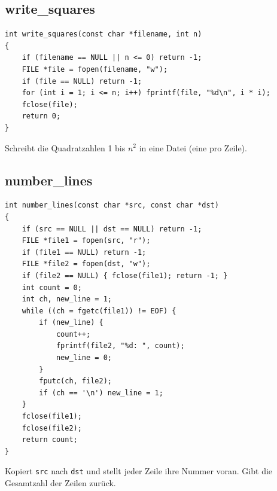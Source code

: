 \documentclass[10pt, a4paper]{article}
\begin{document}
\subsection{write\_squares}
\begin{lstlisting}
int write_squares(const char *filename, int n)
{
    if (filename == NULL || n <= 0) return -1;
    FILE *file = fopen(filename, "w");
    if (file == NULL) return -1;
    for (int i = 1; i <= n; i++) fprintf(file, "%d\n", i * i);
    fclose(file);
    return 0;
}
\end{lstlisting}
Schreibt die Quadratzahlen 1 bis $n^2$ in eine Datei (eine pro Zeile).

\subsection{number\_lines}
\begin{lstlisting}
int number_lines(const char *src, const char *dst)
{
    if (src == NULL || dst == NULL) return -1;
    FILE *file1 = fopen(src, "r");
    if (file1 == NULL) return -1;
    FILE *file2 = fopen(dst, "w");
    if (file2 == NULL) { fclose(file1); return -1; }
    int count = 0;
    int ch, new_line = 1;
    while ((ch = fgetc(file1)) != EOF) {
        if (new_line) {
            count++;
            fprintf(file2, "%d: ", count);
            new_line = 0;
        }
        fputc(ch, file2);
        if (ch == '\n') new_line = 1;
    }
    fclose(file1);
    fclose(file2);
    return count;
}
\end{lstlisting}
Kopiert \texttt{src} nach \texttt{dst} und stellt jeder Zeile ihre Nummer voran. Gibt die Gesamtzahl der Zeilen zur\"uck.
\end{document}
